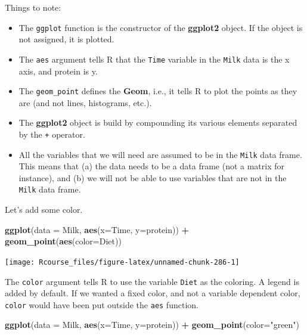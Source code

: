 \documentclass[]{book}
\newenvironment{Shaded}{\begin{snugshade}}{\end{snugshade}}
\newcommand{\KeywordTok}[1]{\textcolor[rgb]{0.13,0.29,0.53}{\textbf{#1}}}
\newcommand{\DataTypeTok}[1]{\textcolor[rgb]{0.13,0.29,0.53}{#1}}
\newcommand{\StringTok}[1]{\textcolor[rgb]{0.31,0.60,0.02}{#1}}
\newcommand{\OperatorTok}[1]{\textcolor[rgb]{0.81,0.36,0.00}{\textbf{#1}}}
\newcommand{\NormalTok}[1]{#1}
\providecommand{\tightlist}{%
  \setlength{\itemsep}{0pt}\setlength{\parskip}{0pt}}
\theoremstyle{definition}
\theoremstyle{definition}
\theoremstyle{definition}
\theoremstyle{remark}
\begin{document}
Things to note:

\begin{itemize}
\tightlist
\item
  The \texttt{ggplot} function is the constructor of the
  \textbf{ggplot2} object. If the object is not assigned, it is plotted.
\item
  The \texttt{aes} argument tells R that the \texttt{Time} variable in
  the \texttt{Milk} data is the x axis, and protein is y.
\item
  The \texttt{geom\_point} defines the \textbf{Geom}, i.e., it tells R
  to plot the points as they are (and not lines, histograms, etc.).
\item
  The \textbf{ggplot2} object is build by compounding its various
  elements separated by the \texttt{+} operator.
\item
  All the variables that we will need are assumed to be in the
  \texttt{Milk} data frame. This means that (a) the data needs to be a
  data frame (not a matrix for instance), and (b) we will not be able to
  use variables that are not in the \texttt{Milk} data frame.
\end{itemize}

Let's add some color.

\begin{Shaded}
\begin{Highlighting}[]
\KeywordTok{ggplot}\NormalTok{(}\DataTypeTok{data =}\NormalTok{ Milk, }\KeywordTok{aes}\NormalTok{(}\DataTypeTok{x=}\NormalTok{Time, }\DataTypeTok{y=}\NormalTok{protein)) }\OperatorTok{+}
\StringTok{  }\KeywordTok{geom_point}\NormalTok{(}\KeywordTok{aes}\NormalTok{(}\DataTypeTok{color=}\NormalTok{Diet))}
\end{Highlighting}
\end{Shaded}

\texttt{[image: Rcourse\_files/figure-latex/unnamed-chunk-286-1]}

The \texttt{color} argument tells R to use the variable \texttt{Diet} as
the coloring. A legend is added by default. If we wanted a fixed color,
and not a variable dependent color, \texttt{color} would have been put
outside the \texttt{aes} function.

\begin{Shaded}
\begin{Highlighting}[]
\KeywordTok{ggplot}\NormalTok{(}\DataTypeTok{data =}\NormalTok{ Milk, }\KeywordTok{aes}\NormalTok{(}\DataTypeTok{x=}\NormalTok{Time, }\DataTypeTok{y=}\NormalTok{protein)) }\OperatorTok{+}
\StringTok{  }\KeywordTok{geom_point}\NormalTok{(}\DataTypeTok{color=}\StringTok{"green"}\NormalTok{)}
\end{Highlighting}
\end{Shaded}
\end{document}
